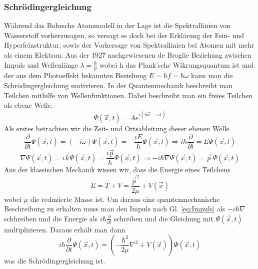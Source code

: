 \documentclass[]{article}
\begin{document}
\subsubsection{Schrödingergleichung}
Während das Bohrsche Atommodell in der Lage ist die Spektrallinien von Wasserstoff vorherzusagen, so versagt es doch bei der Erklärung der Fein- und Hyperfeinstruktur, sowie der Vorhersage von Spektrallinien bei Atomen mit mehr als einem Elektron. Aus der 1927 nachgewiesenen de Broglie Beziehung zwischen Impuls und Wellenlänge $ \lambda=\frac{h}{p} $ wobei h das Plank'sche Wikrungsquantum ist und der aus dem Photoeffekt bekannten Beziehung $ E=hf=\hbar \omega $ kann man die Schrödingergleichung motivieren. In der Quantenmechanik beschreibt man Teilchen mithilfe von Wellenfunktionen. Dabei beschreibt man ein freies Teilchen als ebene Welle.
\begin{equation}
\Psi(\vec{x},t)=A e^{i(k \vec{x}-\omega t)}
\end{equation} 
Als erstes betrachten wir die Zeit- und Ortsableitung dieser ebenen Welle. 
\begin{equation}
\label{eq:Energie} \frac{\partial}{\partial t} \Psi(\vec{x},t)=(-i\omega)  \Psi(\vec{x},t)=-\frac{iE}{\hbar} \Psi(\vec{x},t) \Rightarrow i\hbar \frac{\partial}{\partial t}=E  \Psi(\vec{x},t) \end{equation}
\begin{equation}
\label{eq:Impuls} \nabla  \Psi(\vec{x},t) =i\vec{k} \Psi(\vec{x},t)=\frac{i\vec{p}}{\hbar} \Psi(\vec{x},t) \Rightarrow -i\hbar \nabla  \Psi(\vec{x},t)= \vec{p}    \: \Psi(\vec{x},t) \end{equation}
Aus der klassischen Mechanik wissen wir, dass die Energie eines Teilchens \begin{equation} E=T+V=\frac{\vec{p}^2}{2\mu}+V(\vec{x}) 	\end{equation} wobei $\mu$ die reduzierte Masse ist. Um daraus eine quantenmechanische Beschreibung zu erhalten muss man den Impuls nach Gl. \ref{eq:Impuls} als $-i\hbar \nabla$ schhreiben und die Energie als $i \hbar \frac{\partial}{\partial t}$ schreiben und die Gleichung mit $\Psi(\vec{x},t)$ multiplizieren. Daraus erhält man dann 
\begin{equation}
\label{eq:Schrodinger}
i\hbar \frac{\partial}{\partial t}\Psi(\vec{x},t)=(-\frac{\hbar^2}{2\mu}\nabla^2+V(\vec{x})) \Psi(\vec{x},t) 
\end{equation}
was die Schrödingergleichung ist.
\end{document}
